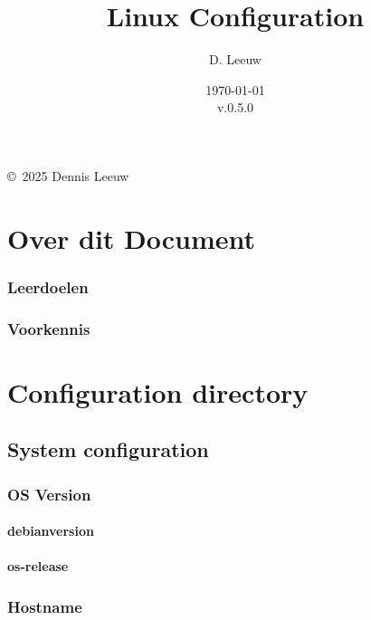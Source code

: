 \documentclass[a4paper,12pt,twoside,openright,titlepage]{book}
\author{D. Leeuw}
\title{Linux Configuration}
\date{\today\\v.0.5.0}
\begin{document}

\maketitle

\copyright\ 2025 Dennis Leeuw\\




\frontmatter
\chapter{Over dit Document}
\subsection{Leerdoelen}

\subsection{Voorkennis}



\tableofcontents

\mainmatter

\chapter{Configuration directory}


\section{System configuration}
\subsection{OS Version}
\subsubsection{debian\textunderscore version}

\subsubsection{os-release}

\subsection{Hostname}

\end{document}
